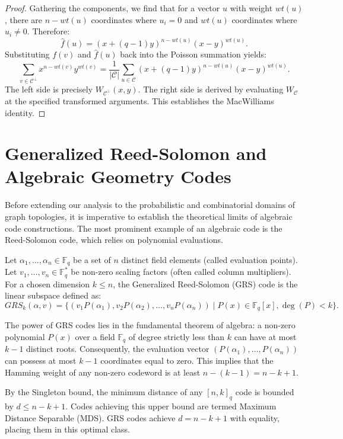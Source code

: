 \begin{proof}
Gathering the components, we find that for a vector $u$ with weight $wt(u)$, there are $n-wt(u)$ coordinates where $u_i=0$ and $wt(u)$ coordinates where $u_i \neq 0$. Therefore:
\[
\widehat{f}(u) = (x + (q-1)y)^{n-wt(u)} (x - y)^{wt(u)}.
\]
Substituting $f(v)$ and $\widehat{f}(u)$ back into the Poisson summation yields:
\[
\sum_{v \in \mathcal{C}^\perp} x^{n-wt(v)} y^{wt(v)} = \frac{1}{|\mathcal{C}|} \sum_{u \in \mathcal{C}} (x + (q-1)y)^{n-wt(u)} (x - y)^{wt(u)}.
\]
The left side is precisely $W_{\mathcal{C}^\perp}(x, y)$. The right side is derived by evaluating $W_{\mathcal{C}}$ at the specified transformed arguments. This establishes the MacWilliams identity.
\end{proof}

\section{Generalized Reed-Solomon and Algebraic Geometry Codes}

Before extending our analysis to the probabilistic and combinatorial domains of graph topologies, it is imperative to establish the theoretical limits of algebraic code constructions. The most prominent example of an algebraic code is the Reed-Solomon code, which relies on polynomial evaluations.

\begin{definition}
Let $\alpha_1, \dots, \alpha_n \in \mathbb{F}_q$ be a set of $n$ distinct field elements (called evaluation points). Let $v_1, \dots, v_n \in \mathbb{F}_q^*$ be non-zero scaling factors (often called column multipliers). For a chosen dimension $k \le n$, the Generalized Reed-Solomon (GRS) code is the linear subspace defined as:
\[
GRS_k(\alpha, v) = \{(v_1 P(\alpha_1), v_2 P(\alpha_2), \dots, v_n P(\alpha_n)) \mid P(x) \in \mathbb{F}_q[x], \deg(P) < k \}.
\]
\end{definition}

The power of GRS codes lies in the fundamental theorem of algebra: a non-zero polynomial $P(x)$ over a field $\mathbb{F}_q$ of degree strictly less than $k$ can have at most $k-1$ distinct roots. Consequently, the evaluation vector $(P(\alpha_1), \dots, P(\alpha_n))$ can possess at most $k-1$ coordinates equal to zero. This implies that the Hamming weight of any non-zero codeword is at least $n - (k - 1) = n - k + 1$. 

By the Singleton bound, the minimum distance of any $[n, k]_q$ code is bounded by $d \le n - k + 1$. Codes achieving this upper bound are termed Maximum Distance Separable (MDS). GRS codes achieve $d = n - k + 1$ with equality, placing them in this optimal class.

